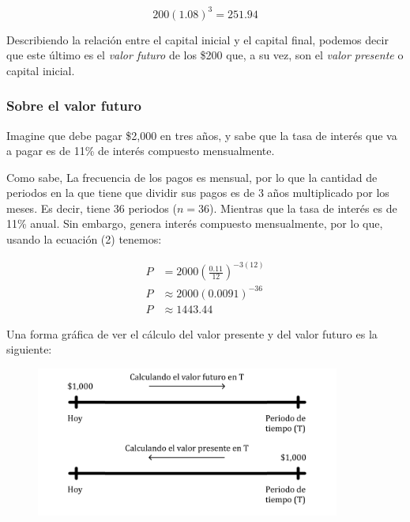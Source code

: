 \documentclass{article}
\begin{document}
                \begin{equation*}
                    200(1.08)^{3} = 251.94
                \end{equation*}

                Describiendo la relación entre el capital inicial y el capital final, podemos decir que este último es el \textit{valor futuro} de los \$200 que, a su vez, son el \textit{valor presente} o capital inicial.

            \subsubsection{Sobre el valor futuro}

                Imagine que debe pagar \$2,000 en tres años, y sabe que la tasa de interés que va a pagar es de 11\% de interés compuesto mensualmente.
                
                Como sabe, La frecuencia de los pagos es mensual, por lo que la cantidad de periodos en la que tiene que dividir sus pagos es de 3 años multiplicado por los meses. Es decir, tiene 36 periodos ($n = 36$). Mientras que la tasa de interés es de 11\% anual. Sin embargo, genera interés compuesto mensualmente, por lo que, usando la ecuación (2) tenemos:

                \begin{equation*}
                \begin{split}
                    P &= 2000 \left(\frac{0.11}{12}\right)^{-3(12)} \\
                    P &\approx 2000(0.0091)^{-36} \\
                    P &\approx 1443.44
                \end{split}
                \end{equation*}

                Una forma gráfica de ver el cálculo del valor presente y del valor futuro es la siguiente:

                \begin{figure}[h]
                    \centering
                    \includegraphics[width=10cm]{img_1.png}
                \end{figure}
\end{document}
